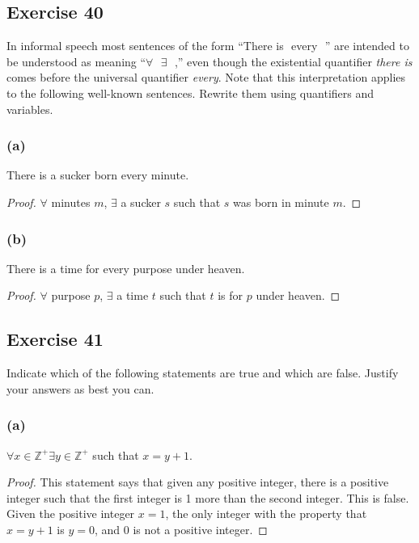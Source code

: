 \documentclass[14pt]{extarticle}
\newcommand{\fbl}{\underline{\hspace{1cm}}\,\,}
\newcommand{\Z}{\mathbb{Z}}
\newcommand{\fa}{\forall}
\newcommand{\te}{\exists}
\begin{document}
\subsection{Exercise 40}
In informal speech most sentences of the form “There is \fbl every \fbl” are intended to be understood as meaning “$\fa$ \fbl $\te$ \fbl,” even though the existential quantifier {\it there is} comes before the universal quantifier {\it every}. Note that this interpretation applies to the following well-known sentences. Rewrite them using quantifiers and variables.

\subsubsection{(a)}
There is a sucker born every minute.

\begin{proof}
    $\fa$ minutes $m$, $\te$ a sucker $s$ such that $s$ was born in minute $m$.
\end{proof}

\subsubsection{(b)}
There is a time for every purpose under heaven.

\begin{proof}
    $\fa$ purpose $p$, $\te$ a time $t$ such that $t$ is for $p$ under heaven.
\end{proof}

\subsection{Exercise 41}
Indicate which of the following statements are true and which are false. Justify your answers as best you can.

\subsubsection{(a)}
$\fa x \in \Z^+ \te y \in \Z^+$ such that $x = y + 1$.

\begin{proof}
    This statement says that given any positive integer, there is a positive integer such that the first integer is 1 more than the second integer. This is false. Given the positive integer $x = 1$, the only integer with the property that $x = y + 1$ is $y = 0$, and 0 is not a positive integer.
\end{proof}
\end{document}
